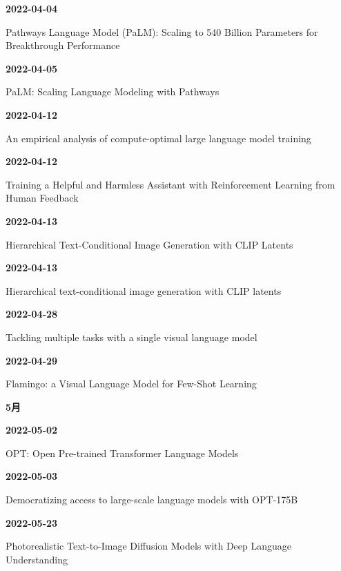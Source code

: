 \smallskip
\noindent\textbf{2022-04-04}\par
{\raggedright Pathways Language Model (PaLM): Scaling to 540 Billion Parameters for Breakthrough Performance\,\cite{src-7823be169a27}\par}
\smallskip
\noindent\textbf{2022-04-05}\par
{\raggedright PaLM: Scaling Language Modeling with Pathways\,\cite{src-1f2518a3517b}\par}
\smallskip
\noindent\textbf{2022-04-12}\par
{\raggedright An empirical analysis of compute-optimal large language model training\,\cite{src-e8da8e8f02bc}\par}
\smallskip
\noindent\textbf{2022-04-12}\par
{\raggedright Training a Helpful and Harmless Assistant with Reinforcement Learning from Human Feedback\,\cite{src-ce2ca3d4fe8f}\par}
\smallskip
\noindent\textbf{2022-04-13}\par
{\raggedright Hierarchical Text-Conditional Image Generation with CLIP Latents\,\cite{src-86ce6205a4ed}\par}
\smallskip
\noindent\textbf{2022-04-13}\par
{\raggedright Hierarchical text-conditional image generation with CLIP latents\,\cite{src-2c38d2f354fa}\par}
\smallskip
\noindent\textbf{2022-04-28}\par
{\raggedright Tackling multiple tasks with a single visual language model\,\cite{src-13aed13ff36c}\par}
\smallskip
\noindent\textbf{2022-04-29}\par
{\raggedright Flamingo: a Visual Language Model for Few-Shot Learning\,\cite{src-c5c7eddb6cf6}\par}
\smallskip
\medskip
\noindent\textbf{5月}\par
\smallskip
\noindent\textbf{2022-05-02}\par
{\raggedright OPT: Open Pre-trained Transformer Language Models\,\cite{src-6ef0db0953a1}\par}
\smallskip
\noindent\textbf{2022-05-03}\par
{\raggedright Democratizing access to large-scale language models with OPT-175B\,\cite{src-99fae124f43c}\par}
\smallskip
\noindent\textbf{2022-05-23}\par
{\raggedright Photorealistic Text-to-Image Diffusion Models with Deep Language Understanding\,\cite{src-cf669aed6653}\par}
